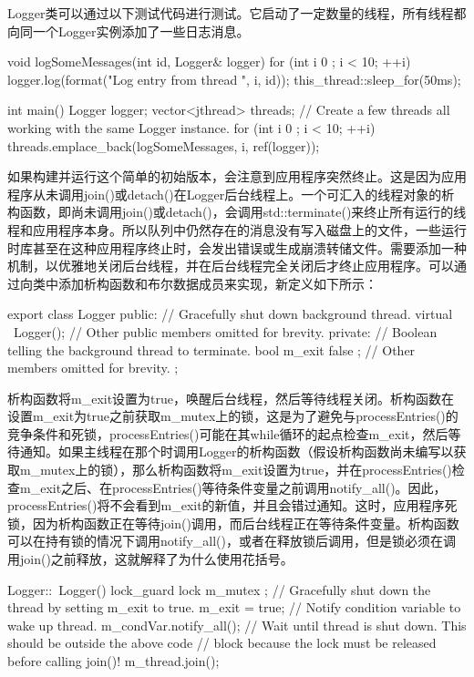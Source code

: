 Logger类可以通过以下测试代码进行测试。它启动了一定数量的线程，所有线程都向同一个Logger实例添加了一些日志消息。

\begin{cpp}
void logSomeMessages(int id, Logger& logger)
{
    for (int i { 0 }; i < 10; ++i) {
        logger.log(format("Log entry {} from thread {}", i, id));
        this_thread::sleep_for(50ms);
    }
}

int main()
{
    Logger logger;
    vector<jthread> threads;
    // Create a few threads all working with the same Logger instance.
    for (int i { 0 }; i < 10; ++i) {
        threads.emplace_back(logSomeMessages, i, ref(logger));
    }
}
\end{cpp}

如果构建并运行这个简单的初始版本，会注意到应用程序突然终止。这是因为应用程序从未调用join()或detach()在Logger后台线程上。一个可汇入的线程对象的析构函数，即尚未调用join()或detach()，会调用std::terminate()来终止所有运行的线程和应用程序本身。所以队列中仍然存在的消息没有写入磁盘上的文件，一些运行时库甚至在这种应用程序终止时，会发出错误或生成崩溃转储文件。需要添加一种机制，以优雅地关闭后台线程，并在后台线程完全关闭后才终止应用程序。可以通过向类中添加析构函数和布尔数据成员来实现，新定义如下所示：

\begin{cpp}
export class Logger
{
    public:
        // Gracefully shut down background thread.
        virtual ~Logger();
        // Other public members omitted for brevity.
    private:
        // Boolean telling the background thread to terminate.
        bool m_exit { false };
        // Other members omitted for brevity.
};
\end{cpp}

析构函数将m\_exit设置为true，唤醒后台线程，然后等待线程关闭。析构函数在设置m\_exit为true之前获取m\_mutex上的锁，这是为了避免与processEntries()的竞争条件和死锁，processEntries()可能在其while循环的起点检查m\_exit，然后等待通知。如果主线程在那个时调用Logger的析构函数（假设析构函数尚未编写以获取m\_mutex上的锁），那么析构函数将m\_exit设置为true，并在processEntries()检查m\_exit之后、在processEntries()等待条件变量之前调用notify\_all()。因此，processEntries()将不会看到m\_exit的新值，并且会错过通知。这时，应用程序死锁，因为析构函数正在等待join()调用，而后台线程正在等待条件变量。析构函数可以在持有锁的情况下调用notify\_all()，或者在释放锁后调用，但是锁必须在调用join()之前释放，这就解释了为什么使用花括号。

\begin{cpp}
Logger::~Logger()
{
    {
        lock_guard lock { m_mutex };
        // Gracefully shut down the thread by setting m_exit to true.
        m_exit = true;
    }
    // Notify condition variable to wake up thread.
    m_condVar.notify_all();
    // Wait until thread is shut down. This should be outside the above code
    // block because the lock must be released before calling join()!
    m_thread.join();
}
\end{cpp}

